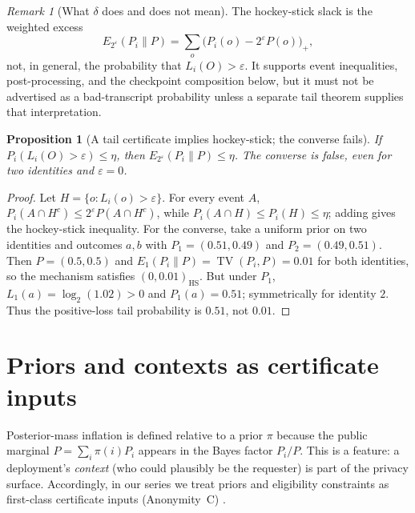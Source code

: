\documentclass[11pt]{article}
\DeclareMathOperator{\TV}{TV}
\newtheorem{proposition}{Proposition}
\theoremstyle{definition}
\theoremstyle{remark}
\newtheorem{remark}{Remark}
\begin{document}
\begin{remark}[What $\delta$ does and does not mean]\label{rem:delta-not-tail}
The hockey-stick slack is the weighted excess
\[
E_{2^\varepsilon}(P_i\|P)
=\sum_o\bigl(P_i(o)-2^\varepsilon P(o)\bigr)_+,
\]
not, in general, the probability that $L_i(O)>\varepsilon$.
It supports event inequalities, post-processing, and the checkpoint composition below, but it must not be advertised as a bad-transcript probability unless a separate tail theorem supplies that interpretation.\cite{LiuCuffVerdu2017,DworkRoth2014}
\end{remark}

\begin{proposition}[A tail certificate implies hockey-stick; the converse fails]\label{prop:tail-vs-hs}
If $P_i(L_i(O)>\varepsilon)\le\eta$, then $E_{2^\varepsilon}(P_i\|P)\le\eta$.
The converse is false, even for two identities and $\varepsilon=0$.
\end{proposition}

\begin{proof}
Let $H=\{o:L_i(o)>\varepsilon\}$.
For every event $A$,
$P_i(A\cap H^c)\le 2^\varepsilon P(A\cap H^c)$, while $P_i(A\cap H)\le P_i(H)\le\eta$; adding gives the hockey-stick inequality.
For the converse, take a uniform prior on two identities and outcomes $a,b$ with
$P_1=(0.51,0.49)$ and $P_2=(0.49,0.51)$.
Then $P=(0.5,0.5)$ and $E_1(P_i\|P)=\TV(P_i,P)=0.01$ for both identities, so the mechanism satisfies $(0,0.01)_{\mathrm{HS}}$.
But under $P_1$, $L_1(a)=\log_2(1.02)>0$ and $P_1(a)=0.51$; symmetrically for identity $2$.
Thus the positive-loss tail probability is $0.51$, not $0.01$.
\end{proof}

\section{Priors and contexts as certificate inputs}\label{sec:priors}
Posterior-mass inflation is defined relative to a prior $\pi$ because the public marginal $P=\sum_i \pi(i)P_i$ appears in the Bayes factor $P_i/P$.
This is a feature: a deployment's \emph{context} (who could plausibly be the requester) is part of the privacy surface.
Accordingly, in our series we treat priors and eligibility constraints as first-class certificate inputs (Anonymity~C) \cite{series:abomoinl}.
\end{document}
